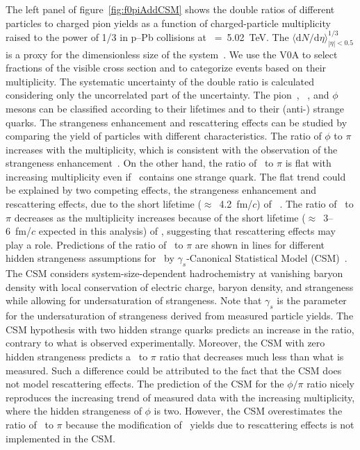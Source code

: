 The left panel of figure~\ref{fig:f0piAddCSM} shows the double ratios of different particles to charged pion yields as a function of charged-particle multiplicity raised to the power of 1/3 in p--Pb collisions at \snn~=~5.02~TeV. The $\langle \mathrm{d}N/\mathrm{d}\eta \rangle_{|\eta|<0.5}^{1/3}$ is a proxy for the dimensionless size of the system~\cite{Liu:2018xae}. We use the V0A to select fractions of the visible cross section and to categorize events based on their multiplicity. The systematic uncertainty of the double ratio is calculated considering only the uncorrelated part of the uncertainty. The pion~\cite{ALICE:2016dei}, \kstar~\cite{ALICE:2016sak}, and $\phi$~\cite{ALICE:2016sak} mesons can be classified according to their lifetimes and to their (anti-) strange quarks. The strangeness enhancement and rescattering effects can be studied by comparing the yield of particles with different characteristics. The ratio of $\phi$ to $\pi$ increases with the multiplicity, which is consistent with the observation of the strangeness enhancement~\cite{ALICE:2016fzo}. On the other hand, the ratio of \kstar~to $\pi$ is flat with increasing multiplicity even if \kstar~contains one strange quark. The flat trend could be explained by two competing effects, the strangeness enhancement and rescattering effects, due to the short lifetime ($\approx$~4.2~fm/$c$) of \kstar~\cite{ParticleDataGroup:2022pth}. The ratio of \fzero~to $\pi$ decreases as the multiplicity increases because of the short lifetime ($\approx$~3--6~fm/$c$ expected in this analysis) of \fzero, suggesting that rescattering effects may play a role. Predictions of the ratio of \fzero~to $\pi$ are shown in lines for different hidden strangeness assumptions for \fzero~by $\gamma_{s}$-Canonical Statistical Model (CSM)~\cite{Vovchenko:2019kes}. The CSM considers system-size-dependent hadrochemistry at vanishing baryon density with local conservation of electric charge, baryon density, and strangeness while allowing for undersaturation of strangeness. Note that $\gamma_{s}$ is the parameter for the undersaturation of strangeness derived from measured particle yields. The CSM hypothesis with two hidden strange quarks predicts an increase in the ratio, contrary to what is observed experimentally. Moreover, the CSM with zero hidden strangeness predicts a \fzero~to $\pi$ ratio that decreases much less than what is measured. Such a difference could be attributed to the fact that the CSM does not model rescattering effects. The prediction of the CSM for the $\phi/\pi$ ratio nicely reproduces the increasing trend of measured data with the increasing multiplicity, where the hidden strangeness of $\phi$ is two. However, the CSM overestimates the ratio of \kstar~to $\pi$ because the modification of \kstar~yields due to rescattering effects is not implemented in the CSM.

